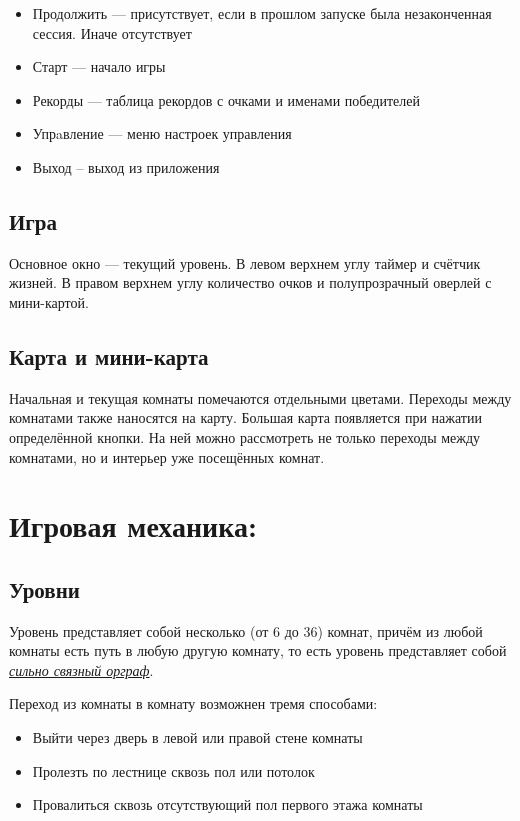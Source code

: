 \documentclass[12pt,a4paper]{article}
\begin{document}
\begin{itemize}
\item Продолжить --- присутствует, если в прошлом запуске была незаконченная сессия. Иначе отсутствует
\item Старт --- начало игры
\item Рекорды --- таблица рекордов с очками и именами победителей
\item Упрaвление --- меню настроек управления
\item Выход -- выход из приложения
\end{itemize}
\subsection{Игра}
\noindent {}

Основное окно --- текущий уровень. В левом верхнем углу таймер и счётчик жизней. В правом верхнем углу количество очков и полупрозрачный оверлей с мини-картой.
\subsection{Карта и мини-карта}
Начальная и текущая комнаты помечаются отдельными цветами. Переходы между комнатами также наносятся на карту.
Большая карта появляется при нажатии определённой кнопки. На ней можно рассмотреть не только переходы между комнатами, но и интерьер уже посещённых комнат.\\
\section{Игровая механика:}
\subsection{Уровни}
Уровень представляет собой несколько (от 6 до 36) комнат, причём из любой комнаты есть путь в любую другую комнату, то есть уровень представляет собой \href{http://ru.wikipedia.org/wiki/%
}{\textit{сильно связный орграф}}.

Переход из комнаты в комнату возможнен тремя способами:
\begin{itemize}
\item Выйти через дверь в левой или правой стене комнаты
\item Пролезть по лестнице сквозь пол или потолок
\item Провалиться сквозь отсутствующий пол первого этажа комнаты
\end{itemize}
\end{document}
